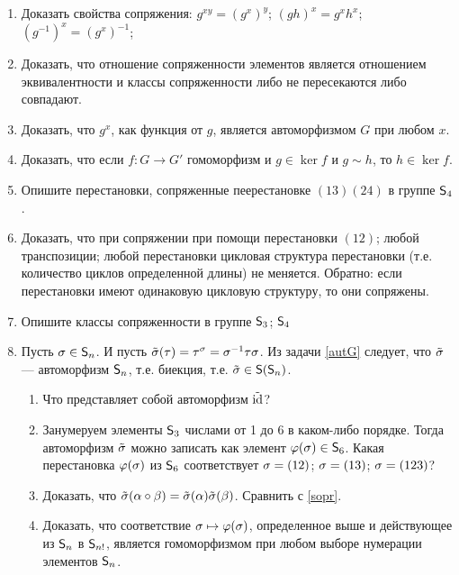 \begin{enumerate}
\item Доказать свойства сопряжения: \ipunkt $g^{xy}=(g^x)^y$; \ipunkt $(gh)^{x}=g^xh^x$; \ipunkt $(g^{-1})^x=(g^x)^{-1}$;\label{sopr}

\item Доказать, что отношение сопряженности элементов является отношением эквивалентности и классы сопряженности либо не пересекаются либо совпадают.

\item Доказать, что $g^x$, как функция от $g$, является автоморфизмом $G$ при любом $x$.\label{autG}

\item Доказать, что если $f:G\to G'$ гомоморфизм и $g\in\ker f$ и $g\sim h$, то $h\in\ker f$.

\item Опишите перестановки, сопряженные пеерестановке $(13)(24)$ в группе ${\mathsf{S}}_4$.

\item Доказать, что при сопряжении при помощи \ipunkt перестановки $(12)$; \ipunkt любой транспозиции; \ipunkt любой перестановки цикловая структура перестановки (т.е. количество циклов определенной длины) не меняется. \ipunkt Обратно: если перестановки имеют одинаковую цикловую структуру, то они сопряжены.

\item Опишите классы сопряженности в группе \ipunkt ${\mathsf{S}}_3$; \ipunkt ${\mathsf{S}}_4$

\item Пусть $\sigma\in{\mathsf{S}}_n$. И пусть $\tilde{\sigma}(\tau)=\tau^\sigma=\sigma^{-1}\tau\sigma$. Из задачи \ref{autG} следует, что 
$\tilde{\sigma}$ --- автоморфизм ${\mathsf{S}}_n$, т.е. биекция, т.е. $\tilde{\sigma}\in {\mathsf{S}}({\mathsf{S}}_n)$.
\begin{enumerate}
\item Что представляет собой автоморфизм $\tilde{\mathrm{id}}$?
\item Занумеруем элементы ${\mathsf{S}}_3$ числами от 1 до 6 в каком-либо порядке. Тогда автоморфизм $\tilde{\sigma}$ можно записать как элемент $\varphi(\sigma)\in{\mathsf{S}}_6$. Какая перестановка $\varphi(\sigma)$ из ${\mathsf{S}}_6$ соответствует \ipunkt $\sigma=(12)$; \ipunkt $\sigma=(13)$; \ipunkt $\sigma=(123)$?
\item Доказать, что $\tilde{\sigma}(\alpha\circ\beta)=\tilde{\sigma}(\alpha)\tilde{\sigma}(\beta)$. Сравнить с \ref{sopr}.
\item Доказать, что соответствие $\sigma\mapsto\varphi(\sigma)$, определенное выше и действующее из ${\mathsf{S}}_n$ в ${\mathsf{S}}_{n!}$, является гомоморфизмом при любом выборе нумерации элементов ${\mathsf{S}}_n$.
\end{enumerate}


\end{enumerate}
